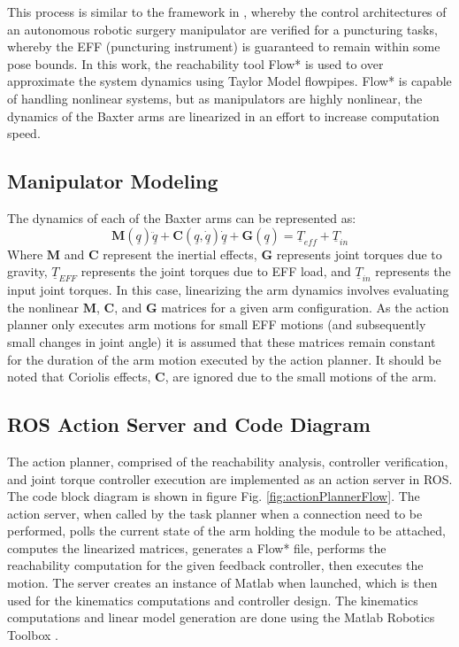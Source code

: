 This process is similar to the framework in \cite{6016596}, whereby the control architectures of an autonomous robotic surgery manipulator are verified for a puncturing tasks, whereby the EFF (puncturing instrument) is guaranteed to remain within some pose bounds.
In this work, the reachability tool Flow* \cite{Chen2013} is used to over approximate the system dynamics using Taylor Model flowpipes.
Flow* is capable of handling nonlinear systems, but as manipulators are highly nonlinear, the dynamics of the Baxter arms are linearized in an effort to increase computation speed. 


\subsection{Manipulator Modeling}
The dynamics of each of the Baxter arms can be represented as:
\begin{equation}
	\mathbf{M}(\underline{q})\ddot{\underline{q}} + \mathbf{C}(\underline{q},\underline{\dot{q}})\dot{\underline{q}} + \mathbf{G}(\underline{q}) = \underline{T}_{eff} + \underline{T}_{in}
\end{equation}
Where $\mathbf{M}$ and $\mathbf{C}$ represent the inertial effects, $\mathbf{G}$ represents joint torques due to gravity, $\underline{T}_{EFF}$ represents the joint torques due to EFF load, and $\underline{T}_{in}$ represents the input joint torques.
In this case, linearizing the arm dynamics involves evaluating the nonlinear $\mathbf{M}$, $\mathbf{C}$, and $\mathbf{G}$ matrices for a given arm configuration.
As the action planner only executes arm motions for small EFF motions (and subsequently small changes in joint angle) it is assumed that these matrices remain constant for the duration of the arm motion executed by the action planner.
It should be noted that Coriolis effects, $\mathbf{C}$, are ignored due to the small motions of the arm.


\subsection{ROS Action Server and Code Diagram}
The action planner, comprised of the reachability analysis, controller verification, and joint torque controller execution are implemented as an action server in ROS.
The code block diagram is shown in figure Fig. \ref{fig:actionPlannerFlow}.
The action server, when called by the task planner when a connection need to be performed, polls the current state of the arm holding the module to be attached, computes the linearized matrices, generates a Flow* file, performs the reachability computation for the given feedback controller, then executes the motion.
The server creates an instance of Matlab when launched, which is then used for the kinematics computations and controller design.
The kinematics computations and linear model generation are done using the Matlab Robotics Toolbox \cite{Corke11a}.

